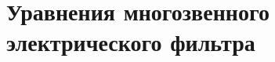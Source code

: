 
\usepackage{xcolor}
\usepackage{float}
\usepackage{hyperref}
\usepackage{tikz}
\usepackage{pgfplots}
\hypersetup{unicode=true}
 
\hypersetup{pdfstartview=FitH,  linkcolor=linkcolor,urlcolor=urlcolor, colorlinks=true}

\sloppy
	\def\authors{Есюнин М.В., Есюнин Д.В.}
	\def\labnum{1}
	\def\labname{Многозвенные LC-фильтры}
	\def\sciadviser{Половинкин А.В.}
\renewcommand{\vec}{\mathbf}
\renewcommand{\phi}{\varphi}
\renewcommand{\kappa}{\varkappa}
\renewcommand{\Re}{\operatorname{Re}}
\renewcommand{\Im}{\operatorname{Im}}

\begin{spacing}{1.2}
\tableofcontents
\end{spacing}
\newpage
\section{Уравнения многозвенного электрического фильтра}

